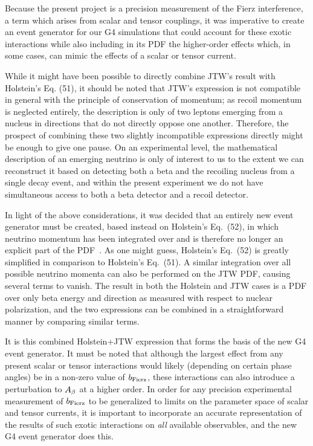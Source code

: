 Because the present project is a precision measurement of the Fierz interference, a term which arises from scalar and tensor couplings, it was imperative to create an event generator for our G4 simulations that could account for these exotic interactions while also including in its PDF the higher-order effects which, in some cases, can mimic the effects of a scalar or tensor current.  

While it might have been possible to directly combine JTW's result with Holstein's Eq. (51), it should be noted that JTW's expression is not compatible in general with the principle of conservation of momentum;  as recoil momentum is neglected entirely, the description is only of two leptons emerging from a nucleus in directions that do not directly oppose one another.  Therefore, the prospect of combining these two slightly incompatible expressions directly might be enough to give one pause.  On an experimental level, the mathematical description of an emerging neutrino is only of interest to us to the extent we can reconstruct it based on detecting both a beta and the recoiling nucleus from a single decay event, and within the present experiment we do not have simultaneous access to both a beta detector and a recoil detector.  

In light of the above considerations, it was decided that an entirely new event generator must be created, based instead on Holstein's Eq.~(52), in which neutrino momentum has been integrated over and is therefore no longer an explicit part of the PDF~\cite{holstein}.  As one might guess, Holstein's Eq.~(52) is greatly simplified in comparison to Holstein's Eq.~(51).  A similar integration over all possible neutrino momenta can also be performed on the JTW PDF, causing several terms to vanish.  The result in both the Holstein and JTW cases is a PDF over only beta energy and direction as measured with respect to nuclear polarization, and the two expressions can be combined in a straightforward manner by comparing similar terms.  

It is this combined Holstein+JTW expression that forms the basis of the new G4 event generator.  It must be noted that although the largest effect from any present scalar or tensor interactions would likely (depending on certain phase angles) be in a non-zero value of $b_{\mathrm{Fierz}}$, these interactions can also introduce a perturbation to $A_{\beta}$ at a higher order.  In order for any precision experimental measurement of $b_{\mathrm{Fierz}}$ to be generalized to limits on the parameter space of scalar and tensor currents, it is important to incorporate an accurate representation of the results of such exotic interactions on \emph{all} available observables, and the new G4 event generator does this.  

